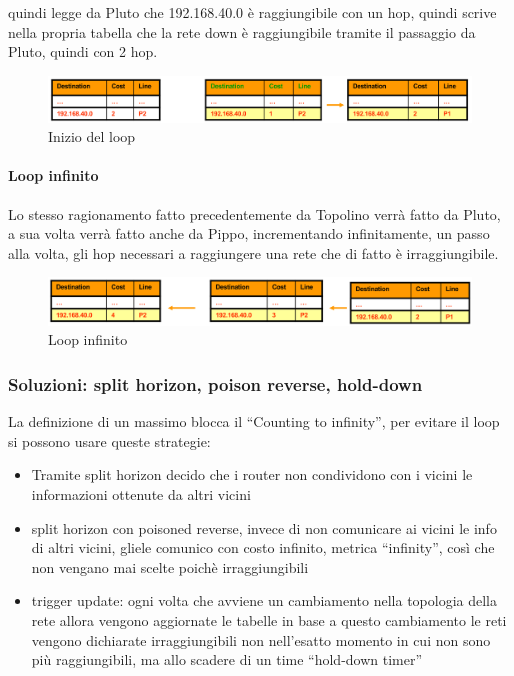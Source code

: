 quindi legge da Pluto che 192.168.40.0 è raggiungibile con un hop, quindi scrive nella propria tabella che la rete down è raggiungibile tramite il passaggio da Pluto, quindi con 2 hop.

\begin{figure}[h!]
    \centering
    \includegraphics[width=1\textwidth]{images/loop2.png}
    \caption{Inizio del loop}
    \label{fig:problemaloop2}
\end{figure}

\newpage
\paragraph{Loop infinito}
Lo stesso ragionamento fatto precedentemente da Topolino verrà fatto da Pluto, a sua volta verrà fatto anche da Pippo, incrementando infinitamente, un passo alla volta, gli hop necessari a raggiungere una rete che di fatto è irraggiungibile.
\begin{figure}[h!]
    \centering
    \includegraphics[width=1\textwidth]{images/loop3.png}
    \caption{Loop infinito}
    \label{fig:problemaloop3}
\end{figure}

\subsubsection{Soluzioni: split horizon, poison reverse, hold-down}
La definizione di un massimo blocca il “Counting to infinity”, per evitare il loop si possono usare queste strategie:
\begin{itemize}
    \item Tramite split horizon decido che i router non condividono con i vicini le informazioni ottenute da altri vicini
    \item split horizon con poisoned reverse, invece di non comunicare ai vicini le info di altri vicini, gliele comunico con costo infinito, metrica “infinity”, così che non vengano mai scelte poichè irraggiungibili
    \item trigger update: ogni volta che avviene un cambiamento nella topologia della rete allora vengono aggiornate le tabelle in base a questo cambiamento 
le reti vengono dichiarate irraggiungibili non nell'esatto momento in cui non sono più raggiungibili, ma allo scadere di un time “hold-down timer” 
\end{itemize}

